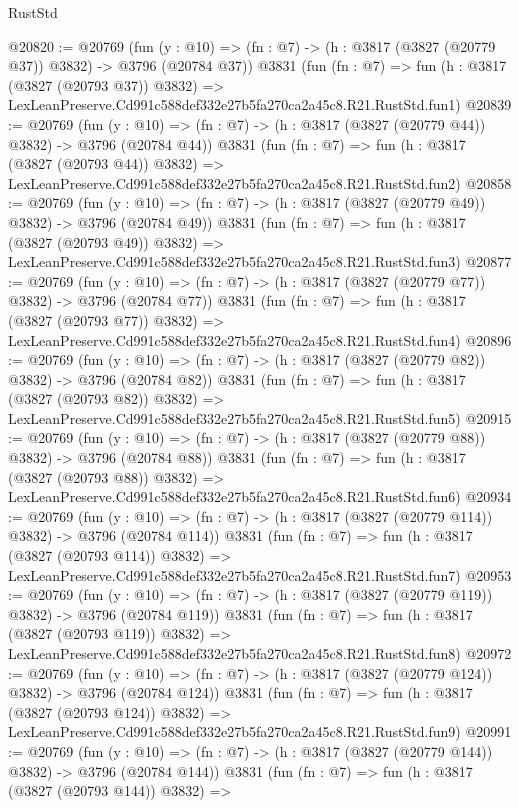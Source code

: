 \begin{lexlean}{RustStd}
\begin{coremodule}
@20820 := @20769
    (fun (y : @10) => (fn : @7) -> (h : @3817 (@3827 (@20779 @37)) @3832) -> @3796 (@20784 @37))
    @3831
    (fun (fn : @7) =>
    fun (h : @3817 (@3827 (@20793 @37)) @3832) =>
    LexLeanPreserve.Cd991c588def332e27b5fa270ca2a45c8.R21.RustStd.fun1)
@20839 := @20769
    (fun (y : @10) => (fn : @7) -> (h : @3817 (@3827 (@20779 @44)) @3832) -> @3796 (@20784 @44))
    @3831
    (fun (fn : @7) =>
    fun (h : @3817 (@3827 (@20793 @44)) @3832) =>
    LexLeanPreserve.Cd991c588def332e27b5fa270ca2a45c8.R21.RustStd.fun2)
@20858 := @20769
    (fun (y : @10) => (fn : @7) -> (h : @3817 (@3827 (@20779 @49)) @3832) -> @3796 (@20784 @49))
    @3831
    (fun (fn : @7) =>
    fun (h : @3817 (@3827 (@20793 @49)) @3832) =>
    LexLeanPreserve.Cd991c588def332e27b5fa270ca2a45c8.R21.RustStd.fun3)
@20877 := @20769
    (fun (y : @10) => (fn : @7) -> (h : @3817 (@3827 (@20779 @77)) @3832) -> @3796 (@20784 @77))
    @3831
    (fun (fn : @7) =>
    fun (h : @3817 (@3827 (@20793 @77)) @3832) =>
    LexLeanPreserve.Cd991c588def332e27b5fa270ca2a45c8.R21.RustStd.fun4)
@20896 := @20769
    (fun (y : @10) => (fn : @7) -> (h : @3817 (@3827 (@20779 @82)) @3832) -> @3796 (@20784 @82))
    @3831
    (fun (fn : @7) =>
    fun (h : @3817 (@3827 (@20793 @82)) @3832) =>
    LexLeanPreserve.Cd991c588def332e27b5fa270ca2a45c8.R21.RustStd.fun5)
@20915 := @20769
    (fun (y : @10) => (fn : @7) -> (h : @3817 (@3827 (@20779 @88)) @3832) -> @3796 (@20784 @88))
    @3831
    (fun (fn : @7) =>
    fun (h : @3817 (@3827 (@20793 @88)) @3832) =>
    LexLeanPreserve.Cd991c588def332e27b5fa270ca2a45c8.R21.RustStd.fun6)
@20934 := @20769
    (fun (y : @10) => (fn : @7) -> (h : @3817 (@3827 (@20779 @114)) @3832) -> @3796 (@20784 @114))
    @3831
    (fun (fn : @7) =>
    fun (h : @3817 (@3827 (@20793 @114)) @3832) =>
    LexLeanPreserve.Cd991c588def332e27b5fa270ca2a45c8.R21.RustStd.fun7)
@20953 := @20769
    (fun (y : @10) => (fn : @7) -> (h : @3817 (@3827 (@20779 @119)) @3832) -> @3796 (@20784 @119))
    @3831
    (fun (fn : @7) =>
    fun (h : @3817 (@3827 (@20793 @119)) @3832) =>
    LexLeanPreserve.Cd991c588def332e27b5fa270ca2a45c8.R21.RustStd.fun8)
@20972 := @20769
    (fun (y : @10) => (fn : @7) -> (h : @3817 (@3827 (@20779 @124)) @3832) -> @3796 (@20784 @124))
    @3831
    (fun (fn : @7) =>
    fun (h : @3817 (@3827 (@20793 @124)) @3832) =>
    LexLeanPreserve.Cd991c588def332e27b5fa270ca2a45c8.R21.RustStd.fun9)
@20991 := @20769
    (fun (y : @10) => (fn : @7) -> (h : @3817 (@3827 (@20779 @144)) @3832) -> @3796 (@20784 @144))
    @3831
    (fun (fn : @7) =>
    fun (h : @3817 (@3827 (@20793 @144)) @3832) =>

\end{coremodule}
\end{lexlean}
